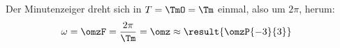 Der Minutenzeiger dreht sich in $T = \TmO = \Tm$ einmal, also um $2\pi$, herum:
\begin{align}
 \omega &= \omzF = \frac{2\pi}{\Tm} = \omz \approx \result{\omzP{-3}{3}}
\end{align}
